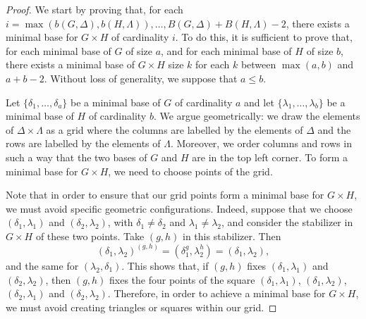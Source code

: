 \documentclass{amsart}
\begin{document}
	\begin{proof}
We start by proving that, for each $i = \max(b(G,\Delta),b(H,\Lambda)), \dots , B(G,\Delta) + B(H,\Lambda) -2$, there exists a minimal base for $G\times H$ of cardinality $i$. To do this, it is sufficient to prove that, for each minimal base of $G$ of size $a$, and for each minimal base of $H$ of size $b$, there exists a minimal base of $G\times H$ size $k$ for each $k$ between $\max(a,b)$ and $a+b-2$. Without loss of generality, we suppose that $a \le b$.

Let $\{\delta_1,\dots,\delta_{a}\}$ be a minimal base of $G$ of cardinality $a$ and let $\{\lambda_1,\dots,\lambda_{b}\}$ be a minimal base of $H$ of cardinality $b$. We argue geometrically: we draw the elements of $\Delta\times \Lambda$ as a grid where the columns are labelled by the elements of $\Delta$ and the rows are labelled by the elements of $\Lambda$. Moreover, we order columns and rows  in such a way that the two bases of $G$ and $H$ are in the top left corner. To form a minimal base for $G\times H$, we need to choose points of the grid.
		
		Note that in order to ensure that our grid points form a minimal base for $G\times H$, we must avoid specific geometric configurations. Indeed, suppose that we choose $(\delta_1,\lambda_1)$ and $(\delta_2,\lambda_2)$, with $\delta_1\ne\delta_2$ and $\lambda_1\ne \lambda_2$, and consider the stabilizer in $G\times H$ of these two points. Take $(g,h)$ in this stabilizer. Then 
		\[
		(\delta_1,\lambda_2)^{(g,h)}= (\delta_1^g,\lambda_2^h) = (\delta_1,\lambda_2),
		\]
		and the same for $(\lambda_2,\delta_1)$. This shows that, if $(g,h)$ fixes $(\delta_1,\lambda_1)$ and $(\delta_2,\lambda_2)$, then $(g,h)$ fixes the four points of the square 
		 $(\delta_1,\lambda_1)$, $(\delta_1,\lambda_2)$, $(\delta_2,\lambda_1)$ and $(\delta_2,\lambda_2)$.
		 Therefore, in order to achieve a minimal base for $G\times H$, we must avoid creating triangles or squares within our grid. 
		 

\end{proof}
\end{document}
